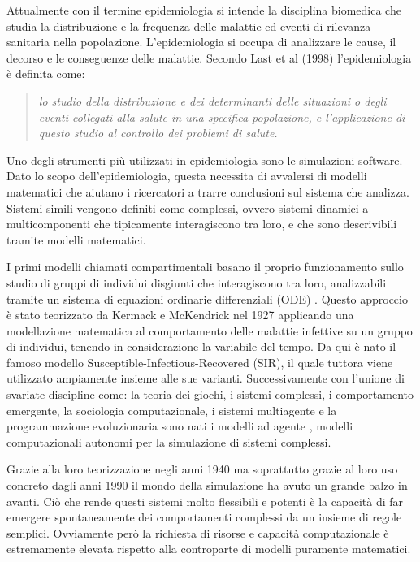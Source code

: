 Attualmente con il termine epidemiologia si intende la 
disciplina biomedica che studia la distribuzione e la 
frequenza delle malattie ed eventi di rilevanza sanitaria 
nella popolazione. L’epidemiologia si occupa di analizzare 
le cause, il decorso e le conseguenze delle malattie. 
Secondo Last et al (1998) l’epidemiologia è definita come: 

\begin{quotation}
    \emph{lo studio della distribuzione e dei determinanti 
    delle situazioni o degli eventi collegati alla salute 
    in una specifica popolazione, e l'applicazione di 
    questo studio al controllo dei problemi di salute.}
\end{quotation}

Uno degli strumenti più utilizzati in epidemiologia sono le 
simulazioni software. 
Dato lo scopo dell’epidemiologia, questa necessita di 
avvalersi di modelli matematici \cite{doi:10.4161/viru.24041} 
che aiutano i ricercatori a trarre conclusioni sul sistema 
che analizza. Sistemi simili vengono definiti come complessi,
\cite{Galea2009-lj} \cite{Ladyman2013} ovvero sistemi 
dinamici a multicomponenti che tipicamente interagiscono 
tra loro, e che sono descrivibili tramite modelli matematici. 

I primi modelli chiamati compartimentali \cite{Bjornstad2020} 
basano il proprio funzionamento sullo studio di gruppi di 
individui disgiunti che interagiscono tra loro, 
analizzabili tramite un sistema di equazioni ordinarie 
differenziali (ODE) \cite{Brauer2008}. 
Questo approccio è stato teorizzato da Kermack e McKendrick 
nel 1927 applicando una modellazione matematica al comportamento 
delle malattie infettive su un gruppo di individui, tenendo in 
considerazione la variabile del tempo. Da qui è nato il famoso modello 
Susceptible-Infectious-Recovered (SIR), 
il quale tuttora viene utilizzato ampiamente insieme alle sue varianti. 
Successivamente con l’unione di svariate discipline come: 
la teoria dei giochi, i sistemi complessi, i comportamento emergente, 
la sociologia computazionale, i sistemi multiagente e 
la programmazione evoluzionaria sono nati i modelli ad agente 
\cite{7822080} \cite{Bissett2021}, modelli computazionali 
autonomi per la simulazione di sistemi complessi. 

Grazie alla loro teorizzazione negli anni 1940 ma soprattutto 
grazie al loro uso concreto dagli anni 1990 il mondo della 
simulazione ha avuto un grande balzo in avanti. 
Ciò che rende questi sistemi molto flessibili e potenti è la 
capacità di far emergere spontaneamente dei comportamenti 
complessi da un insieme di regole semplici. 
Ovviamente però la richiesta di risorse e capacità 
computazionale è estremamente elevata rispetto alla 
controparte di modelli puramente matematici. 

